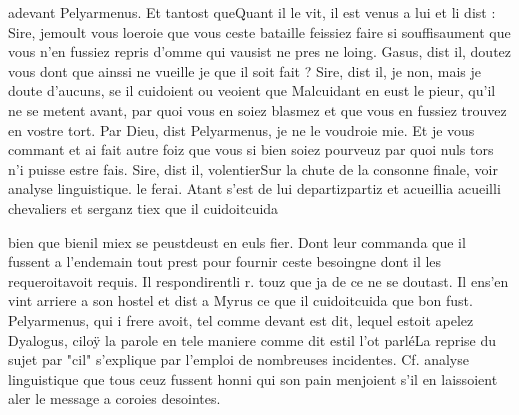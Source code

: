 \documentclass{article}
\begin{document}
\begin{pages}
                  adevant
               Pelyarmenus. 
                  Et tantost queQuant il le vit, il est venus a lui et li dist : Sire, 
                     jemoult vous loeroie que vous ceste bataille feissiez faire si souffisaument que
                  vous n’en fussiez repris d’omme qui vausist ne pres ne loing.
               Gasus, dist il, doutez vous dont que ainssi ne vueille je
                  que 
                     il soit fait ?
               Sire, dist il, je non, mais je doute d’aucuns, se il 
                     cuidoient ou veoient que Malcuidant en eust le
                  pieur, qu’il ne se metent avant, par quoi vous en soiez blasmez et 
                     que vous en fussiez trouvez en vostre tort.
               Par Dieu, dist Pelyarmenus, je ne le voudroie mie. Et je vous commant et ai fait 
                     autre foiz que vous si bien soiez pourveuz par quoi nuls tors n’i puisse 
                     estre fais.
               Sire, dist il, volentierSur la chute de la consonne finale, voir analyse linguistique. le
                  ferai. Atant s’est de lui 
                  departizpartiz et 
                  acueillia acueilli chevaliers et serganz tiex que il 
                  cuidoitcuida
               
                  
                  bien que 
                  bienil miex se 
                  peustdeust en euls fier. Dont leur commanda que il fussent a l’endemain tout prest pour
               fournir ceste besoingne dont il les 
                  requeroitavoit requis. Il 
                  respondirentli r. touz que ja de ce ne 
                     se doutast. Il 
                  ens'en vint arriere a son hostel et dist a Myrus ce
               que il 
                     cuidoitcuida que bon fust. \pend
            \pstart Pelyarmenus,
               qui i frere avoit, tel comme devant est dit, 
                  lequel estoit apelez Dyalogus, ciloÿ la parole en tele maniere comme
                  dit estil l'ot parléLa reprise du sujet par "cil" s'explique par l'emploi
                  de nombreuses incidentes. Cf. analyse linguistique que tous ceuz fussent honni qui son pain menjoient s’il en laissoient
                  aler le message a coroies desointes.
               


\end{pages}
\end{document}
